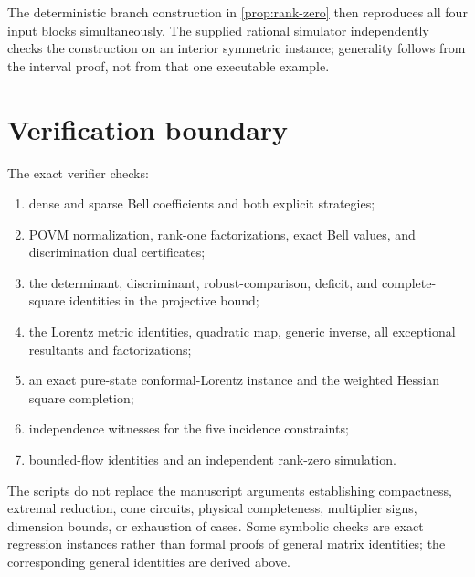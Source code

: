The deterministic branch construction in
\cref{prop:rank-zero} then reproduces all four input blocks simultaneously.
The supplied rational simulator independently checks the construction on an
interior symmetric instance; generality follows from the interval proof, not
from that one executable example.

\section{Verification boundary}
\label{app:verification}

The exact verifier checks:
\begin{enumerate}[leftmargin=*]
\item dense and sparse Bell coefficients and both explicit strategies;
\item POVM normalization, rank-one factorizations, exact Bell values, and
  discrimination dual certificates;
\item the determinant, discriminant, robust-comparison, deficit, and
  complete-square identities in the projective bound;
\item the Lorentz metric identities, quadratic map, generic inverse, all
  exceptional resultants and factorizations;
\item an exact pure-state conformal-Lorentz instance and the weighted Hessian
  square completion;
\item independence witnesses for the five incidence constraints;
\item bounded-flow identities and an independent rank-zero simulation.
\end{enumerate}

The scripts do not replace the manuscript arguments establishing compactness,
extremal reduction, cone circuits, physical completeness, multiplier signs,
dimension bounds, or exhaustion of cases. Some symbolic checks are exact
regression instances rather than formal proofs of general matrix identities;
the corresponding general identities are derived above.
